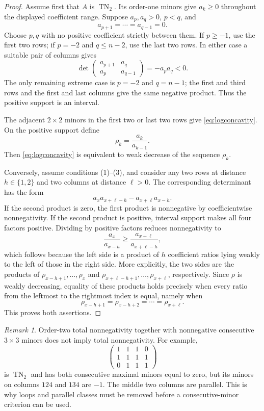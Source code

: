 \documentclass{amsart}
\numberwithin{equation}{section}
\theoremstyle{definition}
\theoremstyle{remark}
\newtheorem{remark}[theorem]{Remark}
\DeclareMathOperator{\TN}{TN}
\begin{document}
\begin{proof}
Assume first that $A$ is $\TN_2$.  Its order-one minors give $a_k\ge0$ throughout the displayed coefficient range.  Suppose $a_p,a_q>0$, $p<q$, and
\[
 a_{p+1}=\cdots=a_{q-1}=0.
\]
Choose $p,q$ with no positive coefficient strictly between them.  If $p\ge-1$, use the first two rows; if $p=-2$ and $q\le n-2$, use the last two rows.  In either case a suitable pair of columns gives
\[
 \det\begin{pmatrix}a_{p+1}&a_q\\a_p&a_{q-1}\end{pmatrix}=-a_pa_q<0.
\]
The only remaining extreme case is $p=-2$ and $q=n-1$; the first and third rows and the first and last columns give the same negative product.  Thus the positive support is an interval.

The adjacent $2\times2$ minors in the first two or last two rows give \eqref{eq:logconcavity}.  On the positive support define
\begin{equation}\label{eq:rho}
 \rho_k=\frac{a_k}{a_{k-1}}.
\end{equation}
Then \eqref{eq:logconcavity} is equivalent to weak decrease of the sequence $\rho_k$.

Conversely, assume conditions (1)--(3), and consider any two rows at distance $h\in\{1,2\}$ and two columns at distance $\ell>0$.  The corresponding determinant has the form
\begin{equation}\label{eq:general2minor}
 a_xa_{x+\ell-h}-a_{x+\ell}a_{x-h}.
\end{equation}
If the second product is zero, the first product is nonnegative by coefficientwise nonnegativity.  If the second product is positive, interval support makes all four factors positive.  Dividing by positive factors reduces nonnegativity to
\[
 \frac{a_x}{a_{x-h}}\ge
 \frac{a_{x+\ell}}{a_{x+\ell-h}},
\]
which follows because the left side is a product of $h$ coefficient ratios lying weakly to the left of those in the right side.  More explicitly, the two sides are the products of $\rho_{x-h+1},\ldots,\rho_x$ and $\rho_{x+\ell-h+1},\ldots,\rho_{x+\ell}$, respectively.  Since $\rho$ is weakly decreasing, equality of these products holds precisely when every ratio from the leftmost to the rightmost index is equal, namely when
\[
 \rho_{x-h+1}=\rho_{x-h+2}=\cdots=\rho_{x+\ell}.
\]
This proves both assertions.
\end{proof}

\begin{remark}\label{rem:naive-consecutive}
Order-two total nonnegativity together with nonnegative consecutive $3\times3$ minors does not imply total nonnegativity.  For example,
\[
 \begin{pmatrix}
 1&1&1&0\\
 1&1&1&1\\
 0&1&1&1
 \end{pmatrix}
\]
is $\TN_2$ and has both consecutive maximal minors equal to zero, but its minors on columns $124$ and $134$ are $-1$.  The middle two columns are parallel.  This is why loops and parallel classes must be removed before a consecutive-minor criterion can be used.
\end{remark}
\end{document}
